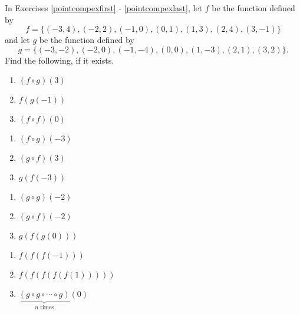 \documentclass{ximera}
\begin{document}
\newpage

In Exercises \ref{pointcompexfirst} - \ref{pointcompexlast}, let $f$ be the function defined by \[f = \{(-3, 4), (-2, 2), (-1, 0), (0, 1), (1, 3), (2, 4), (3, -1)\}\] and let $g$ be the function defined by \[g = \{(-3, -2), (-2, 0), (-1, -4), (0, 0), (1, -3), (2, 1), (3, 2)\}.\]  Find the following, if it exists.

\begin{multicols}{3}
\begin{enumerate}
\setcounter{enumi}{\value{HW}}

\item $(f \circ g)(3)$ \label{pointcompexfirst}
\item $f(g(-1))$
\item $(f \circ f)(0)$

\setcounter{HW}{\value{enumi}}
\end{enumerate}
\end{multicols}

\begin{multicols}{3}
\begin{enumerate}
\setcounter{enumi}{\value{HW}}


\item $(f \circ g)(-3)$
\item $(g \circ f)(3)$
\item $g(f(-3))$


\setcounter{HW}{\value{enumi}}
\end{enumerate}
\end{multicols}

\begin{multicols}{3}
\begin{enumerate}
\setcounter{enumi}{\value{HW}}

\item $(g \circ g)(-2)$
\item $(g \circ f)(-2)$
\item $g(f(g(0)))$


\setcounter{HW}{\value{enumi}}
\end{enumerate}
\end{multicols}

\begin{multicols}{3}
\begin{enumerate}
\setcounter{enumi}{\value{HW}}

\item $f(f(f(-1)))$
\item $f(f(f(f(f(1)))))$
\item $\underbrace{(g \circ g \circ \cdots \circ g)}_{\mbox{$n$ times}}(0)$ 

\setcounter{HW}{\value{enumi}}
\end{enumerate}
\end{multicols}
\end{document}
